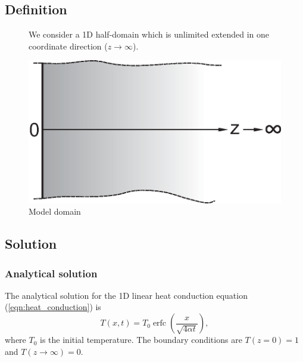 \subsection{Definition}

\begin{figure}[!htb]
\begin{minipage}[t]{0.48\textwidth}
\vspace{-1.5cm}
We consider a 1D half-domain which is unlimited extended in one coordinate direction ($z\rightarrow\infty$).  
\end{minipage}
\hspace{0.02\textwidth}
\begin{minipage}[t]{0.48\textwidth}
\centering
\includegraphics[scale=0.28]{PART_II/T/LHD.eps}
\caption{Model domain}
\label{fig:}
\end{minipage}
\end{figure}

\vspace{-1cm}

\subsection{Solution}
\subsubsection{Analytical solution}

The analytical solution for the 1D linear heat conduction equation (\ref{eqn:heat_conduction}) is
\begin{equation}
T(x,t) = T_0 \operatorname{erfc} \left(\frac{x}{\sqrt{4\alpha t}}\right),
\label{eqn:lhd}
\end{equation}
where $T_0$ is the initial temperature. The boundary conditions are $T(z=0)=1$ and $T(z\rightarrow\infty)=0$.

